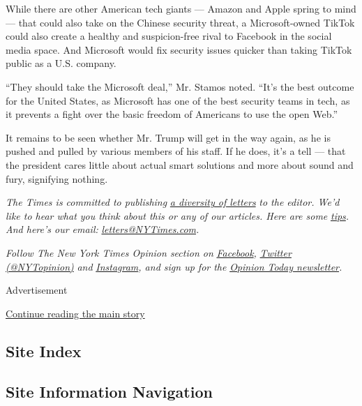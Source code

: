While there are other American tech giants --- Amazon and Apple spring
to mind --- that could also take on the Chinese security threat, a
Microsoft-owned TikTok could also create a healthy and suspicion-free
rival to Facebook in the social media space. And Microsoft would fix
security issues quicker than taking TikTok public as a U.S. company.

``They should take the Microsoft deal,'' Mr. Stamos noted. ``It's the
best outcome for the United States, as Microsoft has one of the best
security teams in tech, as it prevents a fight over the basic freedom of
Americans to use the open Web.''

It remains to be seen whether Mr. Trump will get in the way again, as he
is pushed and pulled by various members of his staff. If he does, it's a
tell --- that the president cares little about actual smart solutions
and more about sound and fury, signifying nothing.

\emph{The Times is committed to publishing}
\href{https://www.nytimes3xbfgragh.onion/2019/01/31/opinion/letters/letters-to-editor-new-york-times-women.html}{\emph{a
diversity of letters}} \emph{to the editor. We'd like to hear what you
think about this or any of our articles. Here are some}
\href{https://help.nytimes3xbfgragh.onion/hc/en-us/articles/115014925288-How-to-submit-a-letter-to-the-editor}{\emph{tips}}\emph{.
And here's our email:}
\href{mailto:letters@NYTimes.com}{\emph{letters@NYTimes.com}}\emph{.}

\emph{Follow The New York Times Opinion section on}
\href{https://www.facebookcorewwwi.onion/nytopinion}{\emph{Facebook}}\emph{,}
\href{http://twitter.com/NYTOpinion}{\emph{Twitter (@NYTopinion)}}
\emph{and}
\href{https://www.instagram.com/nytopinion/}{\emph{Instagram}}\emph{,
and sign up for the}
\href{http://www.nytimes3xbfgragh.onion/newsletters/opiniontoday/}{\emph{Opinion
Today newsletter}}\emph{.}

Advertisement

\protect\hyperlink{after-bottom}{Continue reading the main story}

\hypertarget{site-index}{%
\subsection{Site Index}\label{site-index}}

\hypertarget{site-information-navigation}{%
\subsection{Site Information
Navigation}\label{site-information-navigation}}

